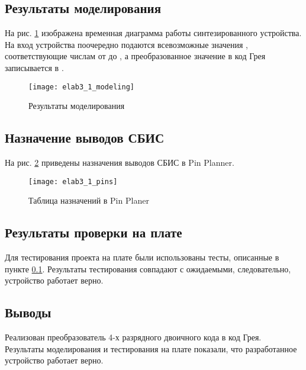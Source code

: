 \subsection{Результаты моделирования}
\label{sec:elab3_1_modeling}

На рис. \ref{fig:elab3_1_modeling} изображена временная диаграмма работы синтезированного устройства. На вход устройства поочередно подаются всевозможные значения , соответствующие числам от  до , а преобразованное значение в код Грея записывается в .

\begin{figure}[H]
\begin{center}
	\texttt{[image: elab3\_1\_modeling]}
	\caption{Результаты моделирования}
	\label{fig:elab3_1_modeling}
\end{center}
\end{figure}

\subsection{Назначение выводов СБИС}

На рис. \ref{fig:elab3_1_pins} приведены назначения выводов СБИС в Pin Planner.

\begin{figure}[H]
\begin{center}
	\texttt{[image: elab3\_1\_pins]}
	\caption{Таблица назначений в Pin Planer}
	\label{fig:elab3_1_pins}
\end{center}
\end{figure}

\subsection{Результаты проверки на плате}

Для тестирования проекта на плате были использованы тесты, описанные в пункте \ref{sec:elab3_1_modeling}. Результаты тестирования совпадают с ожидаемыми, следовательно, устройство работает верно.

\subsection{Выводы}

Реализован преобразователь 4-х разрядного двоичного кода в код Грея. Результаты моделирования и тестирования на плате показали, что разработанное устройство работает верно.

